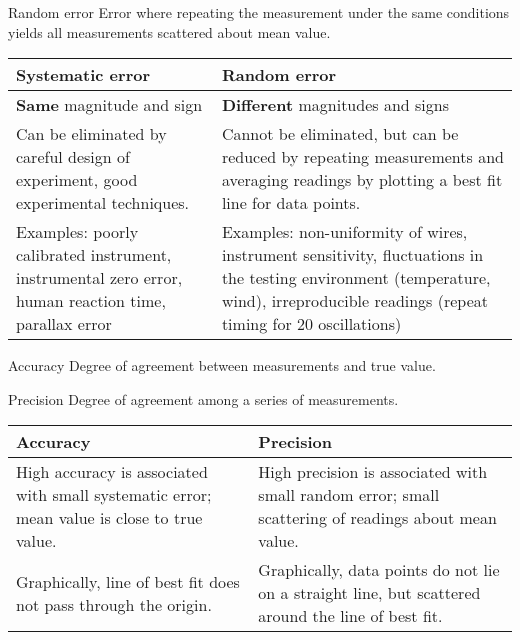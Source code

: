 \begin{defn}{Random error}{}
Error where repeating the measurement under the same conditions yields all measurements scattered about mean value.
\end{defn}

\begin{table}[H]
    \centering
    \begin{tabular}{p{7.5cm}p{7.5cm}}
    \hline\hline
    \textbf{Systematic error} & \textbf{Random error} \\
    \hline
    \textbf{Same} magnitude and sign & \textbf{Different} magnitudes and signs \\
    Can be eliminated by careful design of experiment, good experimental techniques. & Cannot be eliminated, but can be reduced by repeating measurements and averaging readings by plotting a best fit line for data points. \\
    Examples: poorly calibrated instrument, instrumental zero error, human reaction time, parallax error & Examples: non-uniformity of wires, instrument sensitivity, fluctuations in the testing environment (temperature, wind), irreproducible readings (repeat timing for 20 oscillations) \\
    \hline\hline
    \end{tabular}
\end{table}

\begin{defn}{Accuracy}{}
Degree of agreement between measurements and true value. \end{defn}

\begin{defn}{Precision}{}
Degree of agreement among a series of measurements. \end{defn}

\begin{table}[H]
    \centering
    \begin{tabular}{p{7.5cm}p{7.5cm}}
    \hline\hline
    \textbf{Accuracy} & \textbf{Precision} \\
    \hline
    High accuracy is associated with small systematic error; mean value is close to true value. & High precision is associated with small random error; small scattering of readings about mean value. \\
    Graphically, line of best fit does not pass through the origin. & Graphically, data points do not lie on a straight line, but scattered around the line of best fit. \\
    \hline\hline
    \end{tabular}
\end{table}
\pagebreak

